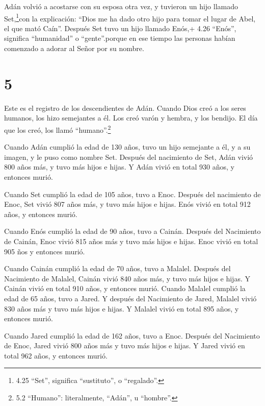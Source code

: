  Adán volvió a acostarse con su esposa otra vez, y tuvieron
un hijo llamado Set,\footnote{4.25 ``Set'', significa ``sustituto'', o
  ``regalado''.}con la explicación: ``Dios me ha dado otro hijo para
tomar el lugar de Abel, el que mató Caín''.  Después Set
tuvo un hijo llamado Enós,+ 4.26 ``Enós'', significa ``humanidad'' o
``gente''.porque en ese tiempo las personas habían comenzado a adorar al
Señor por su nombre.

\hypertarget{section-4}{%
\section{5}\label{section-4}}

 Este es el registro de los descendientes de Adán. Cuando
Dios creó a los seres humanos, los hizo semejantes a él. 
Los creó varón y hembra, y los bendijo. El día que los creó, los llamó
``humano''.\footnote{5.2 ``Humano'': literalmente, ``Adán'', u
  ``hombre''.}

 Cuando Adán cumplió la edad de 130 años, tuvo un hijo
semejante a él, y a su imagen, y le puso como nombre Set. 
Después del nacimiento de Set, Adán vivió 800 años más, y tuvo más hijos
e hijas.  Y Adán vivió en total 930 años, y entonces murió.

 Cuando Set cumplió la edad de 105 años, tuvo a Enoc.
 Después del nacimiento de Enoc, Set vivió 807 años más, y
tuvo más hijos e hijas.  Enós vivió en total 912 años, y
entonces murió.

 Cuando Enós cumplió la edad de 90 años, tuvo a Cainán.
 Después del Nacimiento de Cainán, Enoc vivió 815 años más
y tuvo más hijos e hijas.  Enoc vivió en total 905 ños y
entonces murió.

 Cuando Cainán cumplió la edad de 70 años, tuvo a Malalel.
 Después del Nacimiento de Malalel, Cainán vivió 840 años
más, y tuvo más hijos e hijas.  Y Cainán vivió en total 910
años, y entonces murió.  Cuando Malalel cumplió la edad de
65 años, tuvo a Jared.  Y después del Nacimiento de Jared,
Malalel vivió 830 años más y tuvo más hijos e hijas.  Y
Malalel vivió en total 895 años, y entonces murió.

 Cuando Jared cumplió la edad de 162 años, tuvo a Enoc.
 Después del Nacimiento de Enoc, Jared vivió 800 años más y
tuvo más hijos e hijas.  Y Jared vivió en total 962 años, y
entonces murió.

